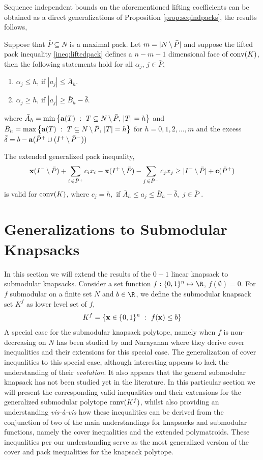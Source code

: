 \documentclass[10pt,twoside]{amsart}
\begin{document}
Sequence independent bounds on the aforementioned lifting coefficients can be obtained as a direct generalizations of Proposition \ref{prop:seqindpacks}, the results follows,
\begin{prop}
  Suppose that $\bar{P} \subseteq N$ is a maximal pack. Let $m = |N\,\backslash\, \bar{P}|$ and suppose the lifted pack inequality \eqref{ineq:liftedpack} defines a $n-m-1$ dimensional face of $\operatorname{conv}(K)$, then the following statements hold for all $\alpha_j,\, j \in \bar{P}$,
  \begin{enumerate}[label=(\roman{*})]
    \item $\alpha_j \leq h$, if $|a_j| \leq \bar{A}_h$.
    \item $\alpha_j \geq h$, if $|a_j| \geq \bar{B}_h - \bar{\delta}$.
  \end{enumerate}
  where $\bar{A}_h = \min\left\{ {\mathbf{a}(T)} \ : \ {T\subseteq N\,\backslash\, \bar{P},\,|T| = h} \right\}$ and $\bar{B}_h = \max\left\{ {\mathbf{a}(T)} \ : \ {T\subseteq N\,\backslash\, \bar{P},\,|T| = h} \right\}$ for $h = 0, 1,2,\ldots, m$ and the excess $\bar{\delta} = b - \mathbf{a}(\bar{P}^+ \cup (I^+\,\backslash\, \bar{P}^-)) $
\end{prop}

\begin{cor}
  The extended generalized pack inequality,
  \begin{align}
    \mathbf{x}(I^-\,\backslash\, \bar{P}) + \sum_{i\,\in \bar{P}^+} c_i x_i - \mathbf{x}(I^+\,\backslash\, \bar{P}) - \sum_{j\,\in \bar{P}^-} c_j {x}_j \geq |I^-\,\backslash\, \bar{P}| + \mathbf{c}(\bar{P}^+)
  \end{align}
  is valid for $\operatorname{conv}(K)$, where $c_j = h,$ if $\bar{A}_h \leq a_j \leq \bar{B}_h - \bar{\delta},\,\,j\in \bar{P}$ .
\end{cor}

\section{Generalizations to Submodular Knapsacks}
In this section we will extend the results of the $0-1$ linear knapsack to submodular knapsacks. Consider a set function $f : \binset^n \mapsto \R$, $f(\emptyset) = 0$. For $f$ submodular on a finite set $N$ and $b \in \R$, we define the submodular knapsack set $K^f$ as lower level set of $f$,
$$
    K^f = \left\{ {\mathbf{x} \in \{0,1\}^n} \ : \ {f(\mathbf{x}) \leq b} \right\}
$$
A special case for the submodular knapsack polytope, namely when $f$ is non-decreasing on $N$ has been studied by \atam and Narayanan \cite{Atamturk2009333} where they derive cover inequalities and their extensions for this special case. The generalization of cover inequalities to this special case, although interesting appears to lack the understanding of their \textit{evolution}. It also appears that the general submodular knapsack has not been studied yet in the literature. In this particular section we will present the corresponding valid inequalities and their extensions for the generalized submodular polytope $\operatorname{conv}(K^f)$, whilst also providing an understanding \emph{vis-\`{a}-vis} how these inequalities can be derived from the conjunction of two of the main understandings for knapsacks and submodular functions, namely the cover inequalities and the extended polymatroids. These inequalities per our understanding serve as the most generalized version of the cover and pack inequalities for the knapsack polytope.
\end{document}
